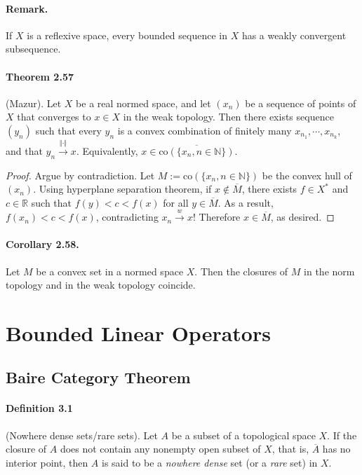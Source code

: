 \documentclass{article}
\begin{document}
\paragraph{Remark.} If $X$ is a reflexive space, every bounded sequence in $X$ has a weakly convergent subsequence.

\paragraph{Theorem 2.57\label{thm:2.57}} (Mazur). Let $X$ be a real normed space, and let $(x_n)$ be a sequence of points of $X$ that converges to $x\in X$ in the weak topology. Then there exists sequence $(y_n)$ such that every $y_n$ is a convex combination of finitely many $x_{n_1},\cdots,x_{n_k}$, and that $y_n\overset{\Vert\cdot\Vert}{\to} x$. Equivalently, $x\in\overline{\mathrm{co}\left(\{x_n,n\in\mathbb{N}\}\right)}$.
\begin{proof}
Argue by contradiction. Let $M:=\mathrm{co}\left(\{x_n,n\in\mathbb{N}\}\right)$ be the convex hull of $(x_n)$. Using hyperplane separation theorem, if $x\notin\overline{M}$, there exists $f\in X^*$ and $c\in\mathbb{R}$ such that $f(y)<c<f(x)$ for all $y\in\overline{M}$. As a result, $f(x_n)<c<f(x)$, contradicting $x_n\overset{w}{\to} x$! Therefore $x\in\overline{M}$, as desired.
\end{proof}

\paragraph{Corollary 2.58.\label{cor:2.58}} Let $M$ be a convex set in a normed space $X$. Then the closures of $M$ in the norm topology and in the weak topology coincide.

\newpage
\section{Bounded Linear Operators}
\subsection{Baire Category Theorem}
\paragraph{Definition 3.1\label{def:3.1}} (Nowhere dense sets/rare sets). Let $A$ be a subset of a topological space $X$. If the closure of $A$ does not contain any nonempty open subset of $X$, that is, $\overline{A}$ has no interior point, then $A$ is said to be a \textit{nowhere dense} set (or a \textit{rare} set) in $X$.
\end{document}
